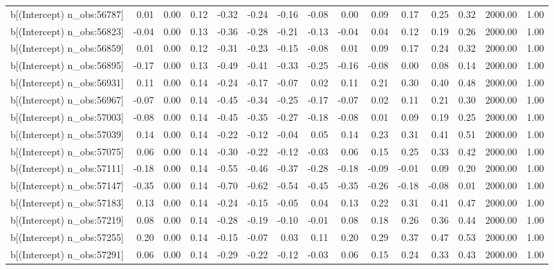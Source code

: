 \begin{table}[ht]
\begin{tabular}{rrrrrrrrrrrrrrr}
  b[(Intercept) n\_obs:56787] & 0.01 & 0.00 & 0.12 & -0.32 & -0.24 & -0.16 & -0.08 & 0.00 & 0.09 & 0.17 & 0.25 & 0.32 & 2000.00 & 1.00 \\ 
  b[(Intercept) n\_obs:56823] & -0.04 & 0.00 & 0.13 & -0.36 & -0.28 & -0.21 & -0.13 & -0.04 & 0.04 & 0.12 & 0.19 & 0.26 & 2000.00 & 1.00 \\ 
  b[(Intercept) n\_obs:56859] & 0.01 & 0.00 & 0.12 & -0.31 & -0.23 & -0.15 & -0.08 & 0.01 & 0.09 & 0.17 & 0.24 & 0.32 & 2000.00 & 1.00 \\ 
  b[(Intercept) n\_obs:56895] & -0.17 & 0.00 & 0.13 & -0.49 & -0.41 & -0.33 & -0.25 & -0.16 & -0.08 & 0.00 & 0.08 & 0.14 & 2000.00 & 1.00 \\ 
  b[(Intercept) n\_obs:56931] & 0.11 & 0.00 & 0.14 & -0.24 & -0.17 & -0.07 & 0.02 & 0.11 & 0.21 & 0.30 & 0.40 & 0.48 & 2000.00 & 1.00 \\ 
  b[(Intercept) n\_obs:56967] & -0.07 & 0.00 & 0.14 & -0.45 & -0.34 & -0.25 & -0.17 & -0.07 & 0.02 & 0.11 & 0.21 & 0.30 & 2000.00 & 1.00 \\ 
  b[(Intercept) n\_obs:57003] & -0.08 & 0.00 & 0.14 & -0.45 & -0.35 & -0.27 & -0.18 & -0.08 & 0.01 & 0.09 & 0.19 & 0.25 & 2000.00 & 1.00 \\ 
  b[(Intercept) n\_obs:57039] & 0.14 & 0.00 & 0.14 & -0.22 & -0.12 & -0.04 & 0.05 & 0.14 & 0.23 & 0.31 & 0.41 & 0.51 & 2000.00 & 1.00 \\ 
  b[(Intercept) n\_obs:57075] & 0.06 & 0.00 & 0.14 & -0.30 & -0.22 & -0.12 & -0.03 & 0.06 & 0.15 & 0.25 & 0.33 & 0.42 & 2000.00 & 1.00 \\ 
  b[(Intercept) n\_obs:57111] & -0.18 & 0.00 & 0.14 & -0.55 & -0.46 & -0.37 & -0.28 & -0.18 & -0.09 & -0.01 & 0.09 & 0.20 & 2000.00 & 1.00 \\ 
  b[(Intercept) n\_obs:57147] & -0.35 & 0.00 & 0.14 & -0.70 & -0.62 & -0.54 & -0.45 & -0.35 & -0.26 & -0.18 & -0.08 & 0.01 & 2000.00 & 1.00 \\ 
  b[(Intercept) n\_obs:57183] & 0.13 & 0.00 & 0.14 & -0.24 & -0.15 & -0.05 & 0.04 & 0.13 & 0.22 & 0.31 & 0.41 & 0.47 & 2000.00 & 1.00 \\ 
  b[(Intercept) n\_obs:57219] & 0.08 & 0.00 & 0.14 & -0.28 & -0.19 & -0.10 & -0.01 & 0.08 & 0.18 & 0.26 & 0.36 & 0.44 & 2000.00 & 1.00 \\ 
  b[(Intercept) n\_obs:57255] & 0.20 & 0.00 & 0.14 & -0.15 & -0.07 & 0.03 & 0.11 & 0.20 & 0.29 & 0.37 & 0.47 & 0.53 & 2000.00 & 1.00 \\ 
  b[(Intercept) n\_obs:57291] & 0.06 & 0.00 & 0.14 & -0.29 & -0.22 & -0.12 & -0.03 & 0.06 & 0.15 & 0.24 & 0.33 & 0.43 & 2000.00 & 1.00 \\ 

\end{tabular}
\end{table}

